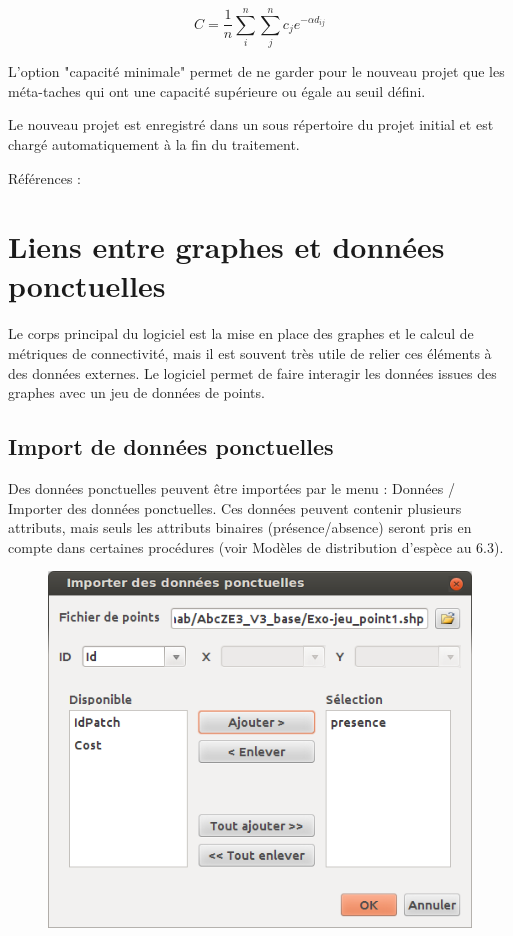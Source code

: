\documentclass{article}
\begin{document}
$$C = \frac{1}{n}\sum_{i}^n\sum_{j}^n c_j e^{-\alpha d_{ij}}$$ 

L’option "capacité minimale" permet de ne garder pour le nouveau projet que les méta-taches qui ont une capacité supérieure ou égale au seuil défini.

Le nouveau projet est enregistré dans un sous répertoire du projet initial et est chargé automatiquement à la fin du traitement.

Références : \cite{2015_monkey}


\section{Liens entre graphes et données ponctuelles}

Le corps principal du logiciel est la mise en place des graphes et le calcul de métriques de connectivité, mais il est souvent très utile de relier ces éléments à des données externes. Le logiciel permet de faire interagir les données issues des graphes avec un jeu de données de points.

\subsection{Import de données ponctuelles}

Des données ponctuelles peuvent être importées par le menu : Données / Importer des données ponctuelles. Ces données peuvent contenir plusieurs attributs, mais seuls les attributs binaires (présence/absence) seront pris en compte dans certaines procédures (voir Modèles de distribution d’espèce au 6.3).

\begin{figure}[H]
	\includegraphics[scale=0.5]{img/manual-fr_img13.png} 
\end{figure}
\end{document}
